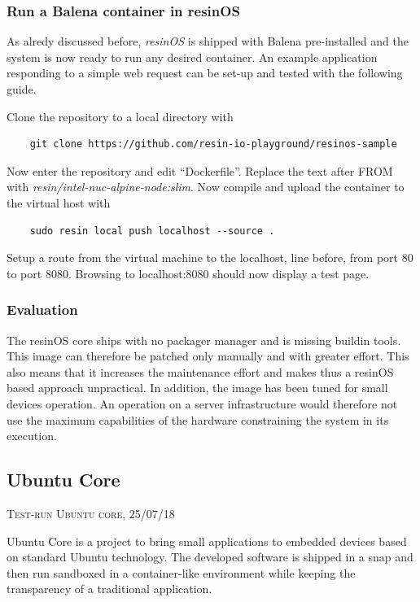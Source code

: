 \documentclass[]{scrartcl}
\begin{document}
\subsubsection{Run a Balena container in resinOS}

As alredy discussed before, \textit{resinOS} is shipped with Balena pre-installed and the system is now ready to run any desired container. 
An example application responding to a simple web request can be set-up and tested with the following guide.

Clone the repository to a local directory with
\begin{verbatim}
	git clone https://github.com/resin-io-playground/resinos-sample
\end{verbatim}

Now enter the repository and edit ``Dockerfile''. Replace the text after FROM with \textit{resin/intel-nuc-alpine-node:slim}. Now compile and upload the container to the virtual host with

\begin{verbatim}
	sudo resin local push localhost --source .
\end{verbatim}

Setup a route from the virtual machine to the localhost, line before, from port 80 to port 8080. Browsing to localhost:8080 should now display a test page.

\subsubsection{Evaluation}

The resinOS core ships with no packager manager and is missing buildin tools. This image can therefore be patched only manually and with greater effort. This also means that it increases the maintenance effort and makes thus a resinOS based approach unpractical. In addition, the image has been tuned for small devices operation. An operation on a server infrastructure would therefore not use the maximum capabilities of the hardware constraining the system in its execution.

\subsection{Ubuntu Core}
{\small\textsc{Test-run Ubuntu core, 25/07/18} \bigskip}

Ubuntu Core is a project to bring small applications to embedded devices based on standard Ubuntu technology. The developed software is shipped in a snap and then run sandboxed in a container-like environment while keeping the transparency of a traditional application. 
\end{document}
